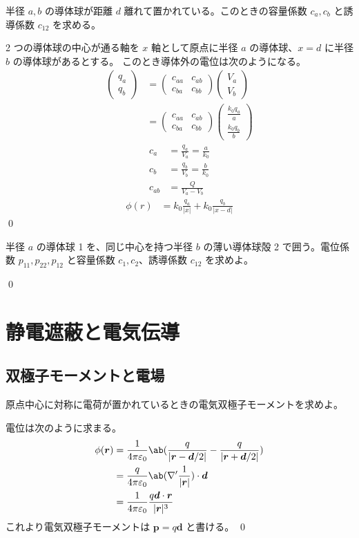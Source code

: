 \documentclass[uplatex,dvipdfmx,a4paper,11pt]{jlreq}
\makeatletter
\newcommand{\rr}{\bm{r}}
\newcommand{\pp}{\bm{p}}
\newcommand{\vnabla}{\mathbf{\nabla}}
\newcommand\mqty[1]{\begin{pmatrix}#1\end{pmatrix}}
\numberwithin{equation}{section}
\theoremstyle{definition}
\renewenvironment{proof}[1][\proofname]{\par
  \normalfont
  \topsep6\p@\@plus6\p@ \trivlist
  \item[\hskip\labelsep{\bfseries #1}\@addpunct{\bfseries}]\ignorespaces\quad\par
}{%
  \qed\endtrivlist\@endpefalse
}
\renewcommand\proofname{証明}
\makeatother
\begin{document}
\begin{problem}
半径 $a, b$ の導体球が距離 $d$ 離れて置かれている。このときの容量係数 $c_a, c_b$ と誘導係数 $c_{12}$ を求める。
\end{problem}
\begin{proof}
  2 つの導体球の中心が通る軸を $x$ 軸として原点に半径 $a$ の導体球、$x = d$ に半径 $b$ の導体球があるとする。
  このとき導体外の電位は次のようになる。
  \begin{align}
    \mqty{q_a                  \\ q_b} & = \mqty{c_{aa} & c_{ab} \\ c_{ba} & c_{bb}}\mqty{V_a \\ V_b} \\
     & = \mqty{c_{aa} & c_{ab} \\ c_{ba} & c_{bb}}\mqty{\frac{k_0q_a}{a} \\ \frac{k_0q_b}{b}}
  \end{align}
  \begin{align}
    c_a    & = \frac{q_a}{V_a} = \frac{a}{k_0} \\
    c_b    & = \frac{q_b}{V_b} = \frac{b}{k_0} \\
    c_{ab} & = \frac{Q}{V_a - V_b}
  \end{align}
  \begin{align}
    \phi(r) & = k_0\frac{q_a}{|x|} + k_0\frac{q_b}{|x - d|}
  \end{align}
\end{proof}

\begin{problem}
半径 $a$ の導体球 1 を、同じ中心を持つ半径 $b$ の薄い導体球殻 2 で囲う。電位係数 $p_{11}, p_{22}, p_{12}$ と容量係数 $c_1, c_2$、誘導係数 $c_{12}$ を求めよ。
\end{problem}
\begin{proof}
\end{proof}

\section{静電遮蔽と電気伝導}
\subsection{双極子モーメントと電場}
\begin{problem}
原点中心に対称に電荷が置かれているときの電気双極子モーメントを求めよ。
\end{problem}
\begin{proof}
  電位は次のように求まる。
  \begin{align}
    \phi(\rr) & = \frac{1}{4\pi\varepsilon_0}\ab(\frac{q}{|\rr - \bm{d}/2|} - \frac{q}{|\rr + \bm{d}/2|}) \\
              & = \frac{q}{4\pi\varepsilon_0}\ab(\vnabla'\frac{1}{|\rr|})\cdot\bm{d}                      \\
              & = \frac{1}{4\pi\varepsilon_0}\frac{q\bm{d}\cdot\rr}{|\rr|^3}
  \end{align}
  これより電気双極子モーメントは $\pp = q\bm{d}$ と書ける。
\end{proof}
\end{document}
